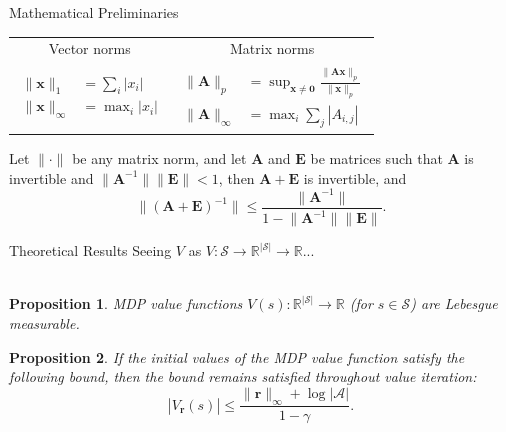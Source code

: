 \documentclass{beamer}
\newtheorem{proposition}{Proposition}
\newcommand{\rinf}{\lVert \mathbf{r} \rVert_\infty}
\newcommand{\vbound}{\frac{\rinf + \log|\mathcal{A}|}{1 - \gamma}}
\begin{document}
\begin{frame}{Mathematical Preliminaries}
  \begin{table}
    \centering
    \begin{tabular}{cc}
      Vector norms & Matrix norms \\
      {$\!\begin{aligned}
          \lVert \mathbf{x} \rVert_1 &= \sum_i |x_i| \\
          \lVert \mathbf{x} \rVert_\infty &= \max_i |x_i|
        \end{aligned}$} & {$\!\begin{aligned}
          \lVert \mathbf{A} \rVert_p &= \sup_{\mathbf{x} \ne \mathbf{0}} \frac{\lVert \mathbf{Ax} \rVert_p}{\lVert \mathbf{x} \rVert_p} \\
          \lVert \mathbf{A} \rVert_\infty &= \max_i \sum_{j} |A_{i,j}|
        \end{aligned}$}
    \end{tabular}
  \end{table}
  \begin{lemma}
    Let $\lVert \cdot \rVert$ be any matrix norm, and let $\mathbf{A}$ and
    $\mathbf{E}$ be matrices such that $\mathbf{A}$ is invertible and $\lVert
    \mathbf{A}^{-1} \rVert \lVert \mathbf{E} \rVert < 1$, then $\mathbf{A} +
    \mathbf{E}$ is invertible, and
    \[
      \lVert (\mathbf{A} + \mathbf{E})^{-1} \rVert \le \frac{\lVert
        \mathbf{A}^{-1} \rVert}{1 - \lVert \mathbf{A}^{-1} \rVert \lVert
        \mathbf{E} \rVert}.
    \]
  \end{lemma}
\end{frame}

\begin{frame}{Theoretical Results}
  Seeing $V$ as $V : \mathcal{S} \to \mathbb{R}^{|\mathcal{S}|} \to
  \mathbb{R}$... \\~\\

  \begin{proposition}
    MDP value functions $V(s) : \mathbb{R}^{|\mathcal{S}|} \to \mathbb{R}$ (for
    $s \in \mathcal{S}$) are Lebesgue measurable.
  \end{proposition}
  \begin{proposition}
    If the initial values of the MDP value function satisfy the following
    bound, then the bound remains satisfied throughout value iteration:
    \[
      |V_{\mathbf{r}}(s)| \le \vbound.
    \]
  \end{proposition}
\end{frame}
\end{document}

